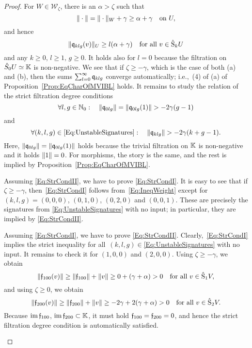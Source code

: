 \documentclass[\MainFolder/Text.tex]{subfiles}
\begin{document}
\begin{proof}
For $W\in \mathcal{W}_\zeta$, there is an $\alpha>\zeta$ such that
\[ \| \cdot \| = \| \cdot \|_W + \gamma \ge  \alpha + \gamma \quad\text{on }U, \]
and hence
\begin{equation}\label{Eq:IneqWeight}
\| \mathfrak{q}_{klg}(v) \|_U \ge l (\alpha + \gamma) \quad\text{for all }v\in\hat{\mathrm{S}}_k U
\end{equation}
and any $k\ge 0$, $l\ge 1$, $g\ge 0$. It holds also for $l=0$ because the filtration on $\hat{S}_0 U \simeq \mathbb{K}$ is non-negative. We see that if $\zeta\ge -\gamma$, which is the case of both (a) and (b), then the sums $\sum_{l=0}^\infty \mathfrak{q}_{klg}$ converge automatically; i.e.,~(4) of (a) of Proposition~\ref{Prop:EqCharOfMVIBL} holds. It remains to study the relation of the strict filtration degree conditions
\begin{equation}\label{Eq:StrCondI}
\forall l, g\in \mathbb{N}_0:\quad  \| \mathfrak{q}_{0lg} \| = \| \mathfrak{q}_{0lg}(1) \|  > - 2\gamma(g-1)
\end{equation}
and
\begin{equation}\label{Eq:StrCondII}
\forall (k,l,g)\in \eqref{Eq:UnstableSignatures}:\quad\| \mathfrak{q}_{klg} \| > -2\gamma(k+g-1).
\end{equation}
Here, $\| \mathfrak{q}_{0lg} \| = \| \mathfrak{q}_{0lg}(1) \|$ holds because the trivial filtration on $\mathbb{K}$ is non-negative and it holds $\| 1 \| = 0$. For morphisms, the story is the same, and the rest is implied by Proposition~\ref{Prop:EqCharOfMVIBL}. 
\begin{ProofList}
\item Assuming \eqref{Eq:StrCondII}, we have to prove \eqref{Eq:StrCondI}. It is easy to see that if $\zeta \ge -\gamma$, then~\eqref{Eq:StrCondI} follows from~\eqref{Eq:IneqWeight} except for $(k,l,g) = (0,0,0)$, $(0,1,0)$, $(0,2,0)$ and $(0,0,1)$. These are precisely the signatures from \eqref{Eq:UnstableSignatures} with no input; in particular, they are implied by \eqref{Eq:StrCondII}.
\item Assuming \eqref{Eq:StrCondI}, we have to prove \eqref{Eq:StrCondII}. Clearly,~\eqref{Eq:StrCondI} implies the strict inequality for all~$(k,l,g)\in$\eqref{Eq:UnstableSignatures} with no input. It remains to check it for $(1,0,0)$ and $(2,0,0)$. Using $\zeta\ge-\gamma$, we obtain
\[ \| \mathfrak{f}_{100}(v) \| \ge \| \mathfrak{f}_{100} \| + \| v \| \ge 0 + (\gamma + \alpha) > 0\quad\text{for all }v\in\hat{\mathrm{S}}_1 V, \] 
and using $\zeta \ge 0$, we obtain
\[ \| \mathfrak{f}_{200}(v) \| \ge \| \mathfrak{f}_{200} \| + \| v \| \ge - 2 \gamma + 2(\gamma + \alpha)>0\quad\text{for all }v\in\hat{\mathrm{S}}_2 V. \]
Because $\operatorname{im} \mathfrak{f}_{100}$, $\operatorname{im} \mathfrak{f}_{200} \subset \mathbb{K}$, it must hold $\mathfrak{f}_{100} = \mathfrak{f}_{200} = 0$, and hence the strict filtration degree condition is automatically satisfied.


\end{ProofList}
\end{proof}
\end{document}
